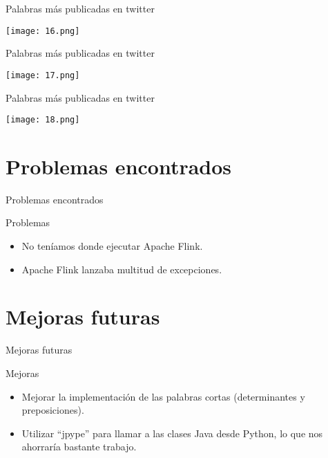 \documentclass{beamer}
\begin{document}
\begin{frame}{Palabras más publicadas en twitter}
	\begin{center}
		\texttt{[image: 16.png]}
	\end{center}
\end{frame}

\begin{frame}{Palabras más publicadas en twitter}
\begin{center}
	\texttt{[image: 17.png]}
\end{center}
\end{frame}

\begin{frame}{Palabras más publicadas en twitter}
\begin{center}
	\texttt{[image: 18.png]}
\end{center}
\end{frame}

\section{Problemas encontrados}
\begin{frame}{Problemas encontrados}
	\begin{block}{Problemas}
		\begin{itemize}
			\item No teníamos donde ejecutar Apache Flink.
			\item Apache Flink lanzaba multitud de excepciones.
		\end{itemize}
	\end{block}
\end{frame}

\section{Mejoras futuras}
\begin{frame}{Mejoras futuras}
\begin{block}{Mejoras}
	\begin{itemize}
		\item Mejorar la implementación de las palabras cortas (determinantes y preposiciones).
		\item Utilizar ``jpype'' para llamar a las clases Java desde Python, lo que nos ahorraría bastante trabajo.
	\end{itemize}
\end{block}
\end{frame}
\end{document}
